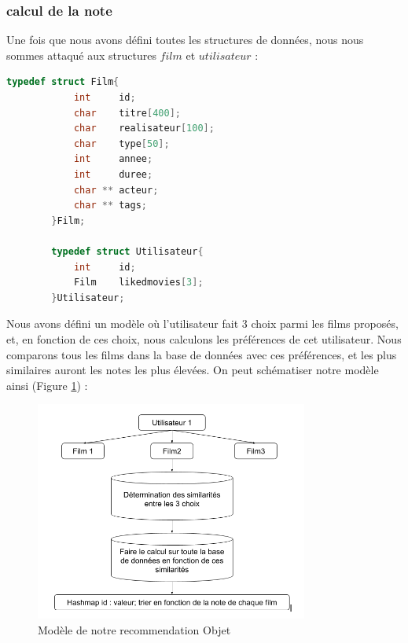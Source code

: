 \documentclass[light]{ceri}
\begin{document}
\subsubsection{calcul de la note}
    Une fois que nous avons défini toutes les structures de données, nous nous sommes attaqué aux structures $film$ et $utilisateur$ :
    \begin{lstlisting}[language=c]
        typedef struct Film{
        	int     id;
        	char    titre[400];
        	char    realisateur[100];
        	char    type[50];
        	int     annee;
        	int     duree;
        	char ** acteur;
        	char ** tags;
        }Film;

        typedef struct Utilisateur{
        	int     id;
        	Film    likedmovies[3];
        }Utilisateur;
    \end{lstlisting}
    Nous avons défini un modèle où l'utilisateur fait 3 choix parmi les films proposés, et, en fonction de ces choix, nous calculons les préférences de cet utilisateur. Nous comparons tous les films dans la base de données avec ces préférences, et les plus similaires auront les notes les plus élevées. On peut schématiser notre modèle ainsi (Figure \ref{calc}) : 
    
\begin{figure}[H]

    \centering
    \includegraphics[width=0.8\textwidth]{images/calc.png} 
    \caption{Modèle de notre recommendation Objet }
    \label{calc}

\end{figure}   
\end{document}
